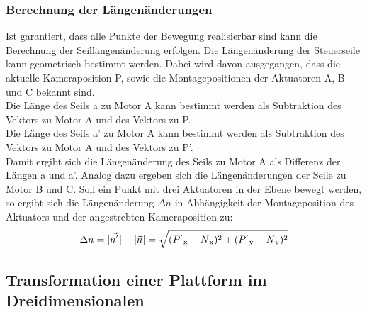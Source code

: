 \documentclass[a4paper, 12pt]{article}
\begin{document}
			\subsubsection{Berechnung der Längenänderungen}
	Ist garantiert, dass alle Punkte der Bewegung realisierbar sind kann die Berechnung der Seillängenänderung erfolgen. 
	Die Längenänderung der Steuerseile kann geometrisch bestimmt werden.
	Dabei wird davon ausgegangen, dass die aktuelle Kameraposition P, sowie die Montagepositionen der Aktuatoren A, B und C bekannt sind.\\
	Die Länge des Seils a zu Motor A kann bestimmt werden als Subtraktion des Vektors zu Motor A und des Vektors zu P.\\
	Die Länge des Seils a' zu Motor A kann bestimmt werden als Subtraktion des Vektors zu Motor A und des Vektors zu P'.\\
	Damit ergibt sich die Längenänderung des Seils zu Motor A als Differenz der Längen a und a'.
	Analog dazu ergeben sich die Längenänderungen der Seile zu Motor B und C.
	Soll ein Punkt mit drei Aktuatoren in der Ebene bewegt werden,
	so ergibt sich die Längenänderung $\Delta n$ in Abhängigkeit der Montageposition des Aktuators und der angestrebten Kameraposition zu:
	\begin{align}
	\Delta n =
	|\vec{n^{'}}|-|\vec{n}|=
	\sqrt{
		(P^{'}\textsubscript{x}-N\textsubscript{x})^2+
		(P^{'}\textsubscript{y}-N\textsubscript{y})^2
	}
	\end{align}
		\subsection{Transformation einer Plattform im Dreidimensionalen}	
\end{document}
